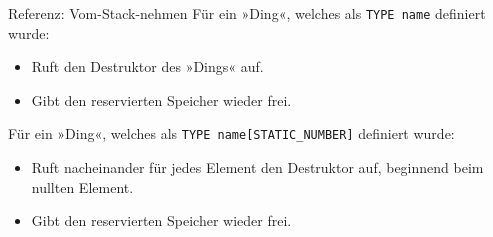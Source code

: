 \begin{frame}[fragile]{Referenz: Vom-Stack-nehmen}
	Für ein »Ding«, welches als \verb|TYPE name| definiert wurde:
	\begin{itemize}
		\item Ruft den Destruktor des »Dings« auf.
		\item Gibt den reservierten Speicher wieder frei.
	\end{itemize}
	
	\vspace{2em}
	
	Für ein »Ding«, welches als \verb|TYPE name[STATIC_NUMBER]| definiert wurde:
	\begin{itemize}
		\item Ruft nacheinander für jedes Element den Destruktor auf, beginnend beim nullten Element.
		\item Gibt den reservierten Speicher wieder frei.
	\end{itemize}
\end{frame}










